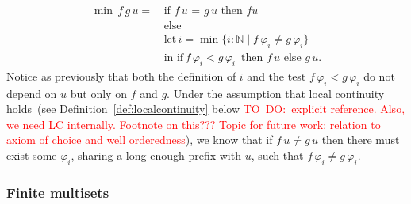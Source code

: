 \documentclass[envcountsame]{llncs}
\newcommand{\todo}[1]{\textcolor{red}{TO~DO:~#1}}
\newcommand{\N}{\mathbb{N}}
\begin{document}
\begin{description}
\begin{align*}
 \min\,f\,g\,u =\,&\text{if $f \,u$ = $g\,u$ then $f u$}\\
                 &\text{else }\\
                 &\text{let}\,i = \min \{ i : \N\mid f\,\varphi_ i \not= g\,\varphi_ i \}\\
                 &\text{in }\text{if}\, f\,\varphi_ i< g\,\varphi_ i\,\text{ then } f\,u \text{ else } g\,u.
\end{align*}
Notice as previously that both the definition of $i$ and the test $f\,\varphi_i < g\,\varphi_ i$ do not depend on $u$ but only on $f$ and $g$. Under the assumption that local continuity holds~(see Definition~\ref{def:localcontinuity} below \todo{explicit reference. Also, we need LC internally. Footnote on this??? Topic for future work: relation to axiom of choice and well orderedness}), we know that if $f\,u\not=g\,u$ then there must exist some $\varphi_i$, sharing a long enough prefix with $u$, such that $f\,\varphi_ i \not= g\,\varphi_ i$.    
\end{description}


\subsubsection*{Finite multisets}
\end{document}
